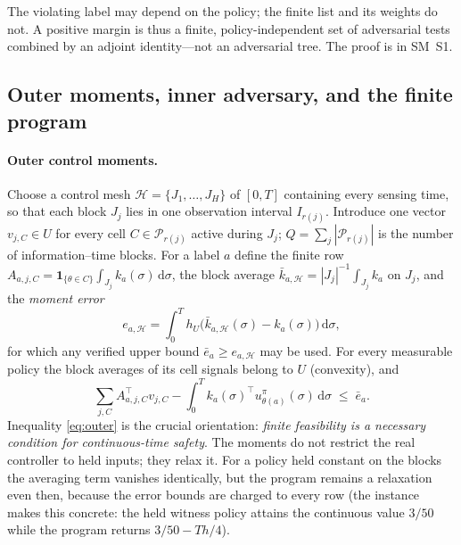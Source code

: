 \documentclass[11pt,a4paper]{article}
\theoremstyle{plain}
\theoremstyle{definition}
\theoremstyle{remark}
\newcommand{\calH}{\mathcal{H}}
\newcommand{\calP}{\mathcal{P}}
\newcommand{\ebar}{\bar{e}}
\newcommand{\dd}{\,\mathrm{d}}
\begin{document}
The violating label may depend on the policy; the finite list and its weights do not. A positive margin is thus a finite, policy-independent set of adversarial tests combined by an adjoint identity---not an adversarial tree. The proof is in SM~S1.

\subsection{Outer moments, inner adversary, and the finite program}

\paragraph{Outer control moments.}
Choose a control mesh $\calH=\{J_1,\dots,J_H\}$ of $[0,T]$ containing every sensing time, so that each block $J_j$ lies in one observation interval $I_{r(j)}$. Introduce one vector $v_{j,C}\in U$ for every cell $C\in\calP_{r(j)}$ active during $J_j$; $Q=\sum_j|\calP_{r(j)}|$ is the number of information--time blocks. For a label $a$ define the finite row $A_{a,j,C}=\mathbf 1_{\{\theta\in C\}}\int_{J_j}k_a(\sigma)\dd\sigma$, the block average $\bar k_{a,\calH}=|J_j|^{-1}\int_{J_j}k_a$ on $J_j$, and the \emph{moment error}
\begin{equation}\label{eq:momerr}
e_{a,\calH}=\int_0^T h_U\bigl(\bar k_{a,\calH}(\sigma)-k_a(\sigma)\bigr)\dd\sigma,
\end{equation}
for which any verified upper bound $\ebar_a\ge e_{a,\calH}$ may be used. For every measurable policy the block averages of its cell signals belong to $U$ (convexity), and
\begin{equation}\label{eq:outer}
\sum_{j,C}A_{a,j,C}^\top v_{j,C}-\int_0^T k_a(\sigma)^\top u^\pi_{\theta(a)}(\sigma)\dd\sigma\;\le\;\ebar_a .
\end{equation}
Inequality \eqref{eq:outer} is the crucial orientation: \emph{finite feasibility is a necessary condition for continuous-time safety}. The moments do not restrict the real controller to held inputs; they relax it. For a policy held constant on the blocks the averaging term vanishes identically, but the program remains a relaxation even then, because the error bounds are charged to every row (the instance makes this concrete: the held witness policy attains the continuous value $3/50$ while the program returns $3/50-Th/4$).
\end{document}
